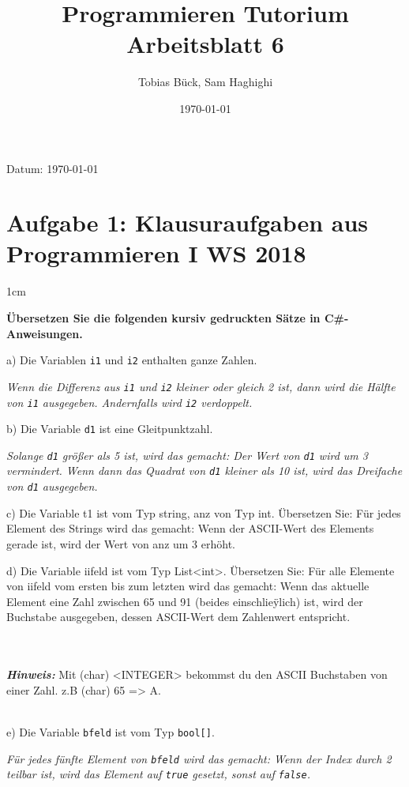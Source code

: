 \documentclass[12pt]{article}
\renewcommand{\maketitle}{
    \begin{center}
        {\LARGE \bfseries \thetitle \par}
        \vspace{0.25em}
        {\small Datum: \today \par}
        \vspace{0.5em}
    \end{center}
}
\newenvironment{aufgabe}[2]
  {%
   \section*{Aufgabe #1: #2}
   \vspace{0.5em}
   \begin{adjustwidth}{1cm}{}  %
  }
  {%
   \end{adjustwidth}
  }
\newcommand{\subaufgabe}[1]{
    #1
}
\newcommand{\hint}[1]{
    \vspace{0.5em}
    \textbf{\textit{Hinweis:}} #1
    \vspace{0.5em}
}
\begin{document}
\title{Programmieren Tutorium \\ \large Arbeitsblatt 6}
\author{Tobias Bück, Sam Haghighi}
\date{\today}
\maketitle

\begin{aufgabe}{1}{Klausuraufgaben aus Programmieren I WS 2018}
\textbf{Übersetzen Sie die folgenden kursiv gedruckten Sätze in C\#-Anweisungen.}

\subaufgabe{a) Die Variablen \texttt{i1} und \texttt{i2} enthalten ganze Zahlen.}
\textit{Wenn die Differenz aus \texttt{i1} und \texttt{i2} kleiner oder gleich 2 ist, dann wird die Hälfte von \texttt{i1} ausgegeben. Andernfalls wird \texttt{i2} verdoppelt.}

\subaufgabe{b) Die Variable \texttt{d1} ist eine Gleitpunktzahl.}
\textit{Solange \texttt{d1} größer als 5 ist, wird das gemacht: Der Wert von \texttt{d1} wird um 3 vermindert. Wenn dann das Quadrat von \texttt{d1} kleiner als 10 ist, wird das Dreifache von \texttt{d1} ausgegeben.}

\subaufgabe{c) Die Variable t1 ist vom Typ string, anz von Typ int. Übersetzen Sie: Für jedes
Element des Strings wird das gemacht: Wenn der ASCII-Wert des Elements gerade ist,
wird der Wert von anz um 3 erhöht.}

\subaufgabe{d) Die Variable iifeld ist vom Typ List<int>. Übersetzen Sie: Für alle Elemente von
iifeld vom ersten bis zum letzten wird das gemacht: Wenn das aktuelle Element eine
Zahl zwischen 65 und 91 (beides einschlieÿlich) ist, wird der Buchstabe ausgegeben, dessen
ASCII-Wert dem Zahlenwert entspricht.}
\\
\\
\hint{
Mit (char) <INTEGER> bekommst du den ASCII Buchstaben von einer Zahl. 
z.B (char) 65 => A.
}
\\
\subaufgabe{e) Die Variable \texttt{bfeld} ist vom Typ \texttt{bool[]}.}
\textit{Für jedes fünfte Element von \texttt{bfeld} wird das gemacht: Wenn der Index durch 2 teilbar ist, wird das Element auf \texttt{true} gesetzt, sonst auf \texttt{false}.}
\end{aufgabe}
\end{document}
